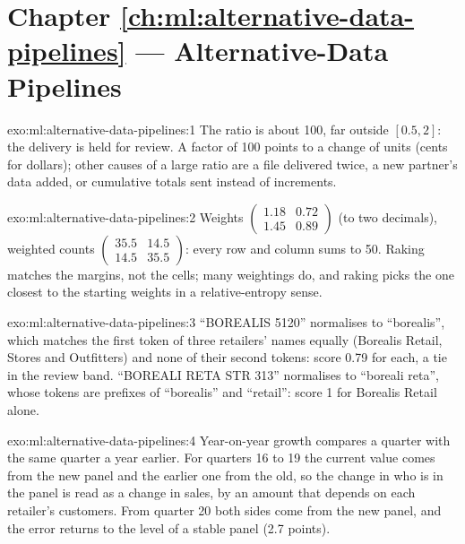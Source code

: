 \section*{Chapter \ref{ch:ml:alternative-data-pipelines} --- Alternative-Data Pipelines}

\begin{solution}{exo:ml:alternative-data-pipelines:1}
The ratio is about 100, far outside $[0.5, 2]$: the delivery is held for review. A factor of 100 points to a change of
units (cents for dollars); other causes of a large ratio are a file delivered twice, a new partner's data added, or
cumulative totals sent instead of increments.
\end{solution}

\begin{solution}{exo:ml:alternative-data-pipelines:2}
Weights $\begin{pmatrix}1.18 & 0.72\\ 1.45 & 0.89\end{pmatrix}$ (to two decimals), weighted counts
$\begin{pmatrix}35.5 & 14.5\\ 14.5 & 35.5\end{pmatrix}$: every row and column sums to 50. Raking matches the margins, not
the cells; many weightings do, and raking picks the one closest to the starting weights in a relative-entropy sense.
\end{solution}

\begin{solution}{exo:ml:alternative-data-pipelines:3}
``BOREALIS 5120'' normalises to ``borealis'', which matches the first token of three retailers' names equally (Borealis
Retail, Stores and Outfitters) and none of their second tokens: score 0.79 for each, a tie in the review band. ``BOREALI RETA
STR 313'' normalises to ``boreali reta'', whose tokens are prefixes of ``borealis'' and ``retail'': score 1 for Borealis
Retail alone.
\end{solution}

\begin{solution}{exo:ml:alternative-data-pipelines:4}
Year-on-year growth compares a quarter with the same quarter a year earlier. For quarters 16 to 19 the current value comes
from the new panel and the earlier one from the old, so the change in who is in the panel is read as a change in sales, by
an amount that depends on each retailer's customers. From quarter 20 both sides come from the new panel, and the error
returns to the level of a stable panel (2.7 points).
\end{solution}

